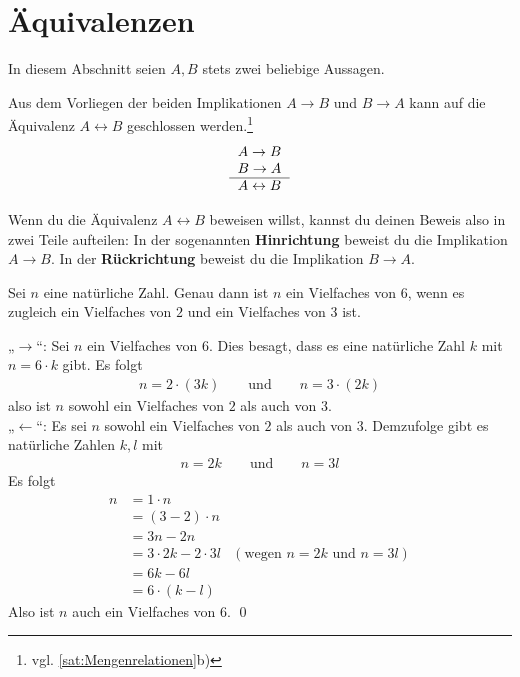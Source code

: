   
  











\section{Äquivalenzen}
In diesem Abschnitt seien $A,B$ stets zwei beliebige Aussagen.


\begin{axi}
Aus dem Vorliegen der beiden Implikationen $A\to B$ und $B\to A$ kann auf die Äquivalenz $A\leftrightarrow B$ geschlossen werden.\footnote{vgl. \cref{sat:Mengenrelationen}b)}
 \[ \begin{tabular}{r}
  $A\to B$ \\
  $B\to A$ \\
  \hline
  $A\leftrightarrow B$
  \end{tabular}\]
\end{axi}


\begin{bem} \label{hinruck}
 Wenn du die Äquivalenz $A\leftrightarrow B$ beweisen willst, kannst du deinen Beweis also in zwei Teile aufteilen: In der sogenannten \textbf{Hinrichtung} beweist du die Implikation $A\to B$. In der \textbf{Rückrichtung} beweist du die Implikation $B\to A$.
\end{bem}



\begin{bsp}
Sei $n$ eine natürliche Zahl. Genau dann ist $n$ ein Vielfaches von $6$, wenn es zugleich ein Vielfaches von $2$ und ein Vielfaches von $3$ ist.
\end{bsp}
\begin{bew}
 „$\to$“: Sei $n$ ein Vielfaches von $6$. Dies besagt, dass es eine natürliche Zahl $k$ mit $n=6\cdot k$ gibt. Es folgt
 \begin{align*}
  n= 2\cdot (3k) \qquad\text{und}\qquad n = 3\cdot (2k)
 \end{align*}
also ist $n$ sowohl ein Vielfaches von $2$ als auch von $3$. \\[0.5em]
„$\leftarrow$“: Es sei $n$ sowohl ein Vielfaches von $2$ als auch von $3$. Demzufolge gibt es natürliche Zahlen $k,l$ mit
\begin{align*}
 n = 2k\qquad \text{und}\qquad n  = 3l
\end{align*}
Es folgt
\begin{align*}
 n & = 1\cdot n \\
 & = (3-2)\cdot n \\
 & = 3n - 2n \\
 & = 3\cdot 2k - 2\cdot 3l & (\text{wegen $n=2k$ und $n=3l$})\\
 & = 6k - 6l \\
 & = 6\cdot (k-l)
\end{align*}
Also ist $n$ auch ein Vielfaches von $6$. \qed
\end{bew}



